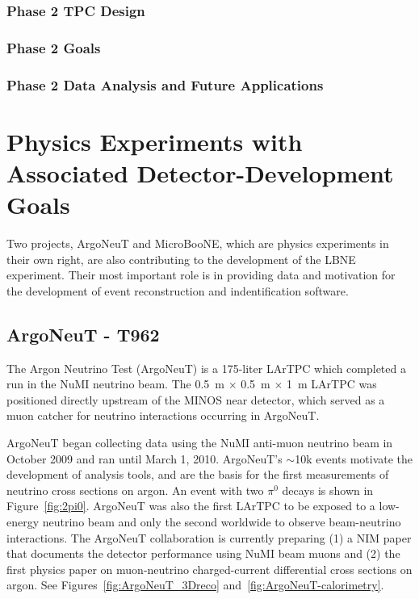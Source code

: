 
\subsubsection{Phase 2 TPC Design }

\subsubsection{Phase 2 Goals}

\subsubsection{Phase 2 Data Analysis and Future Applications}


\section{Physics Experiments with Associated Detector-Development Goals}

Two projects, ArgoNeuT and MicroBooNE,  which are physics experiments in their own right, are also contributing to the development of the LBNE experiment. Their most important role is in providing data and motivation for the development of event reconstruction and indentification software.

\subsection{ArgoNeuT - T962}
The Argon Neutrino Test (ArgoNeuT) is a 175-liter LArTPC which completed a run in the NuMI neutrino beam.  The 0.5~m $\times$ 0.5~m $\times$ 1~m LArTPC was positioned directly upstream of the MINOS near detector, which served as a muon catcher for neutrino interactions occurring in ArgoNeuT. 

ArgoNeuT began collecting data using the NuMI anti-muon neutrino beam in October 2009 and ran until  March 1, 2010.  ArgoNeuT's $\sim$10k events motivate the development of analysis tools, and are the basis for the first measurements of neutrino cross sections on argon.   An event with two $\pi^{0}$ decays is shown in Figure~\ref{fig:2pi0}.   ArgoNeuT was also the first LArTPC to be exposed to a low-energy neutrino beam and only the second worldwide to observe beam-neutrino interactions. The ArgoNeuT collaboration is currently preparing (1) a NIM paper that documents the detector performance using NuMI beam muons and (2) the first physics paper on muon-neutrino charged-current differential cross sections on argon.  See Figures~\ref{fig:ArgoNeuT_3Dreco} and~\ref{fig:ArgoNeuT-calorimetry}.

